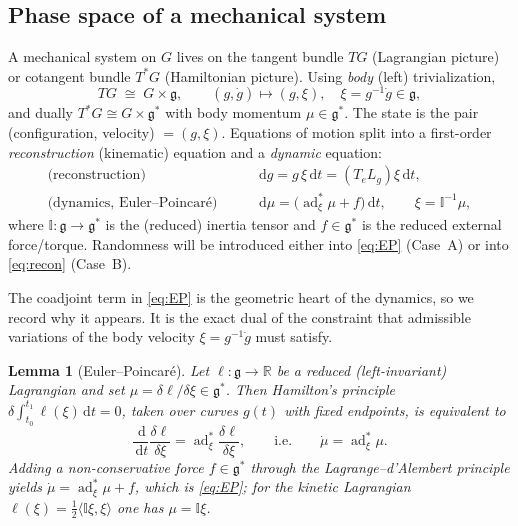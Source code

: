 \documentclass[11pt]{article}
\theoremstyle{plain}
\newtheorem{lemma}{Lemma}
\theoremstyle{definition}
\newcommand{\g}{\mathfrak{g}}
\newcommand{\gstar}{\mathfrak{g}^{*}}
\newcommand{\adstar}{\operatorname{ad}^{*}}
\newcommand{\cd}{\,\mathrm{d}}          %
\newcommand{\dt}{\,\mathrm{d}t}
\newcommand{\R}{\mathbb{R}}
\newcommand{\inner}[2]{\langle #1,#2\rangle}
\newcommand{\half}{\tfrac{1}{2}}
\begin{document}
\subsection{Phase space of a mechanical system}
\label{sec:phasespace}

A mechanical system on $G$ lives on the tangent bundle $TG$ (Lagrangian picture)
or cotangent bundle $T^*G$ (Hamiltonian picture). Using \emph{body}
(left) trivialization,
\begin{equation}
  TG \;\cong\; G\times\g, \qquad (g,\dot g)\longmapsto (g,\xi),\quad \xi=g^{-1}\dot g\in\g,
\end{equation}
and dually $T^*G\cong G\times\gstar$ with body momentum $\mu\in\gstar$. The state
is the pair (configuration, velocity) $=(g,\xi)$. Equations of motion split into
a first-order \emph{reconstruction} (kinematic) equation and a
\emph{dynamic} equation:
\begin{align}
  \text{(reconstruction)}\qquad & \cd g = g\,\xi\dt = (T_eL_g)\xi\dt, \label{eq:recon}\\
  \text{(dynamics, Euler--Poincar\'e)}\qquad & \cd \mu = \big(\adstar_\xi\mu + f\big)\dt,
      \qquad \xi=\mathbb{I}^{-1}\mu, \label{eq:EP}
\end{align}
where $\mathbb{I}\colon\g\to\gstar$ is the (reduced) inertia tensor and
$f\in\gstar$ is the reduced external force/torque. Randomness will be introduced
either into \eqref{eq:EP} (Case~A) or into \eqref{eq:recon} (Case~B).

The coadjoint term in \eqref{eq:EP} is the geometric heart of the dynamics, so we
record why it appears. It is the exact dual of the constraint that admissible
variations of the body velocity $\xi=g^{-1}\dot g$ must satisfy.

\begin{lemma}[Euler--Poincar\'e]
\label{lem:EP}
Let $\ell\colon\g\to\R$ be a reduced (left-invariant) Lagrangian and set
$\mu=\delta\ell/\delta\xi\in\gstar$. Then Hamilton's principle
$\delta\int_{t_0}^{t_1}\ell(\xi)\dt=0$, taken over curves $g(t)$ with fixed
endpoints, is equivalent to
\begin{equation}
  \frac{\cd}{\cd t}\frac{\delta\ell}{\delta\xi}=\adstar_\xi\frac{\delta\ell}{\delta\xi},
  \qquad\text{i.e.}\qquad \dot\mu=\adstar_\xi\mu .
  \label{eq:EP-free}
\end{equation}
Adding a non-conservative force $f\in\gstar$ through the Lagrange--d'Alembert
principle yields $\dot\mu=\adstar_\xi\mu+f$, which is \eqref{eq:EP}; for the
kinetic Lagrangian $\ell(\xi)=\half\inner{\mathbb{I}\xi}{\xi}$ one has
$\mu=\mathbb{I}\xi$.
\end{lemma}
\end{document}
